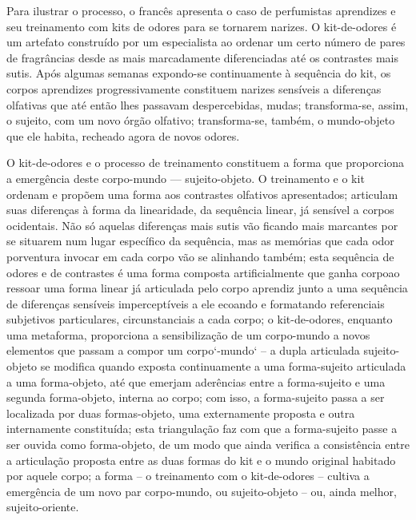 Para ilustrar o processo, o francês apresenta o caso de perfumistas aprendizes e seu treinamento com kits de odores para se tornarem narizes. O kit-de-odores é um artefato construído por um especialista ao ordenar um certo número de pares de fragrâncias desde as mais marcadamente diferenciadas até os contrastes mais sutis. Após algumas semanas expondo-se continuamente à sequência do kit, os corpos aprendizes progressivamente constituem narizes sensíveis a diferenças olfativas que até então lhes passavam despercebidas, mudas; transforma-se, assim, o sujeito, com um novo órgão olfativo; transforma-se, também, o mundo-objeto que ele habita, recheado agora de novos odores.

O kit-de-odores e o processo de treinamento constituem a forma que proporciona a emergência deste corpo-mundo --- sujeito-objeto. O treinamento e o kit ordenam e propõem uma forma aos contrastes olfativos apresentados; articulam suas diferenças à forma da linearidade, da sequência linear, já sensível a corpos ocidentais. Não só aquelas diferenças mais sutis vão ficando mais marcantes por se situarem num lugar específico da sequência, mas as memórias que cada odor porventura invocar em cada corpo vão se alinhando também; esta sequência de odores e de contrastes é uma forma composta artificialmente que \guillemetleft ganha corpo\guillemetright ao ressoar uma forma linear já articulada pelo corpo aprendiz junto a uma sequência de diferenças sensíveis imperceptíveis a ele ecoando e formatando referenciais subjetivos particulares, circunstanciais a cada corpo; o kit-de-odores, enquanto uma metaforma, proporciona a sensibilização de um corpo-mundo a novos elementos que passam a compor um corpo`-mundo` -- a dupla articulada sujeito-objeto se modifica quando exposta continuamente a uma forma-sujeito articulada a uma forma-objeto, até que emerjam aderências entre a forma-sujeito e uma segunda forma-objeto, interna ao corpo; com isso, a forma-sujeito passa a ser localizada por duas formas-objeto, uma externamente proposta e outra internamente constituída; esta triangulação faz com que a forma-sujeito passe a ser ouvida como forma-objeto, de um modo que ainda verifica a consistência entre a articulação proposta entre as duas formas do kit e o mundo original habitado por aquele corpo; a forma -- o treinamento com o kit-de-odores -- cultiva a emergência de um novo par corpo-mundo, ou sujeito-objeto -- ou, ainda melhor, sujeito-oriente.

